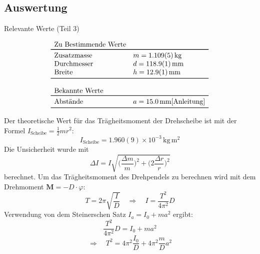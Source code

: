 \documentclass[11pt,a4paper]{article}
\renewcommand{\vec}{\boldsymbol}
\begin{document}
\subsection{Auswertung}

\begin{table}[ht]
\caption{Relevante Werte (Teil 3)}
$$
\begin{array}{ll}
	\multicolumn{1}{l}{\textrm{Zu Bestimmende Werte}} \\
	\toprule 
	\textrm{Zusatzmasse} & m = 1.109(5)\,\textrm{kg} \\
	\textrm{Durchmesser} & d = 118.9(1)\,\textrm{mm} \\
	\textrm{Breite} & h = 12.9(1)\,\textrm{mm} \\
	\bottomrule \\
	\multicolumn{2}{l}{\textrm{Bekannte Werte}} \\
	\toprule
	\textrm{Abstände} & a = 15.0\,\textrm{mm}\cite{Anleitung}\\
	\bottomrule 
\end{array}
$$
\end{table}

Der theoretische Wert für das Trägheitsmoment der Drehscheibe ist mit der Formel $I_{\textrm{Scheibe}} = \frac{1}{2}mr^2$:
$$I_{\textrm{Scheibe}} = 1.960(9)\times 10^{-3}\,\textrm{kg}\,\textrm{m}^2$$
Die Unsicherheit wurde mit $$\Delta I = I\sqrt{\bigg(\frac{\Delta m}{m}\bigg)^2 + \bigg(2\frac{\Delta r}{r}\bigg)^2}$$ berechnet. 
Um das Trägheitsmoment des Drehpendels zu berechnen wird mit dem Drehmoment $\vec M = -D\cdot \varphi$:
$$T = 2\pi \sqrt{\frac{I}{D}}\quad \Rightarrow \quad I = \frac{T^2}{4\pi^2}D$$
Verwendung von dem Steinerschen Satz $I_a = I_0 + ma^2$ ergibt:
$$\frac{T^2}{4\pi^2}D = I_0 + ma^2$$ 
\begin{equation}\label{req}
	\Rightarrow \quad T^2 = 4\pi^2 \frac{I_0}{D} + 4\pi^2 \frac{m}{D}a^2
\end{equation}
\end{document}
